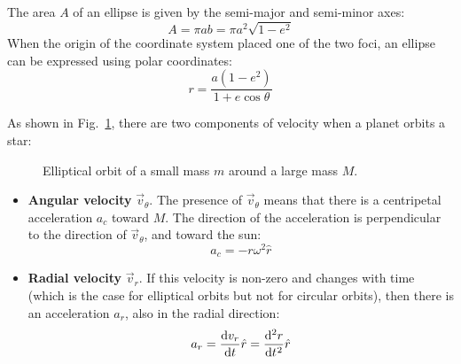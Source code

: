 \documentclass{../../../oss-handout}
\begin{document}
The area $A$ of an ellipse is given by the semi-major and semi-minor axes:
\begin{equation}
  A=\pi ab=\pi a^2\sqrt{1-e^2}
  \label{A2}
\end{equation}
When the origin of the coordinate system placed one of the two foci, an ellipse
can be expressed using polar coordinates:
\begin{equation}
  r=\frac{a(1-e^2)}{1+e\cos\theta}
  \label{ellipse-eq}
\end{equation}

As shown in Fig.~\ref{eorbit}, there are two components of velocity when a
planet orbits a star:
\begin{figure}[!ht]
  \centering
  \caption{Elliptical orbit of a small mass $m$ around a large mass $M$.}
  \label{eorbit}
\end{figure}
\begin{itemize}
\item\textbf{Angular velocity} $\vec v_\theta$. The presence of
  $\vec v_\theta$ means that there is a centripetal acceleration $a_c$ toward
  $M$. The direction of the acceleration is perpendicular to the direction of
  $\vec v_\theta$, and toward the sun:
  \begin{equation}
    a_c=-r\omega^2\hat r
  \end{equation}
\item\textbf{Radial velocity} $\vec v_r$. If this velocity is non-zero and
  changes with time (which is the case for elliptical orbits but not for
  circular orbits), then there is an acceleration $a_r$, also in the radial
  direction:
  \begin{equation}
    a_r=\diff{v_r}t\hat r=\diff[2]rt\hat r
  \end{equation}
\end{itemize}
\end{document}
